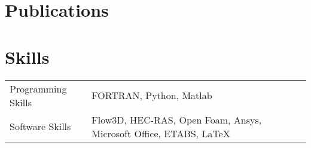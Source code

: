 \documentclass[a4paper,12pt]{article}
\begin{document}
\section{Publications}
\begin{refsection}
\nocite{*}
\printbibliography[heading=none]
\end{refsection}

\section{Skills}
\begin{tabularx}{\linewidth}{@{}l X@{}}
Programming Skills &  \normalsize{FORTRAN, Python, Matlab}\\
Software Skills  &  \normalsize{Flow3D, HEC-RAS, Open Foam, Ansys, Microsoft Office, ETABS,  \LaTeX  }\\

\end{tabularx}

\vfill
{}
\end{document}

